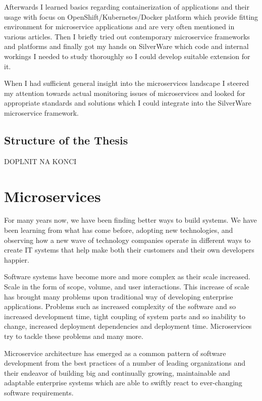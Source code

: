 \documentclass[12pt,oneside]{fithesis2}
\begin{document}
Afterwards I learned basics regarding containerization of applications and their usage with focus on OpenShift/Kubernetes/Docker platform which provide fitting environment for microservice applications and are very often mentioned in various articles. Then I briefly tried out contemporary microservice frameworks and platforms and finally got my hands on SilverWare which code and internal workings I needed to study thoroughly so I could develop suitable extension for it.

When I had sufficient general insight into the microservices landscape I steered my attention towards actual monitoring issues of microservices and looked for appropriate standards and solutions which I could integrate into the SilverWare microservice framework.

\section{Structure of the Thesis}

DOPLNIT NA KONCI

\chapter{Microservices}

For many years now, we have been finding better ways to build systems. We have been learning from what has come before, adopting new technologies, and observing how a new wave of technology companies operate in different ways to create IT systems that help make both their customers and their own developers happier. \cite{ma}

Software systems have become more and more complex as their scale increased. Scale in the form of scope, volume, and user interactions. This increase of scale has brought many problems upon traditional way of developing enterprise applications. Problems such as increased complexity of the software and so increased development time, tight coupling of system parts and so inability to change, increased deployment dependencies and deployment time. Microservices try to tackle these problems and many more.

Microservice architecture has emerged as a common pattern of software development from the best practices of a number of leading organizations and their endeavor of building big and continually growing, maintainable and adaptable enterprise systems which are able to swiftly react to ever-changing software requirements.
\end{document}
